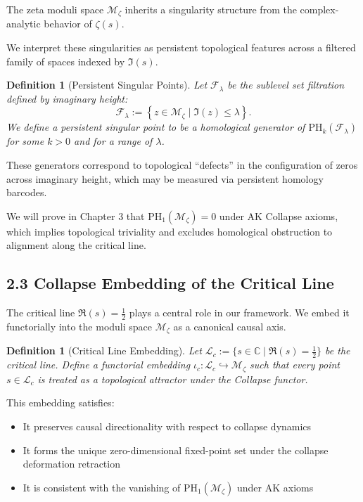 \documentclass[11pt]{article}
\newtheorem{definition}[theorem]{Definition}
\begin{document}
The zeta moduli space $\mathcal{M}_\zeta$ inherits a singularity structure from the complex-analytic behavior of $\zeta(s)$.

We interpret these singularities as persistent topological features across a filtered family of spaces indexed by $\Im(s)$.

\begin{definition}[Persistent Singular Points]
Let $\mathcal{F}_\lambda$ be the sublevel set filtration defined by imaginary height:
\[
\mathcal{F}_\lambda := \left\{ z \in \mathcal{M}_\zeta \mid \Im(z) \leq \lambda \right\}.
\]
We define a \emph{persistent singular point} to be a homological generator of $\mathrm{PH}_k(\mathcal{F}_\lambda)$ for some $k > 0$ and for a range of $\lambda$.
\end{definition}

These generators correspond to topological ``defects'' in the configuration of zeros across imaginary height,  
which may be measured via persistent homology barcodes.

We will prove in Chapter 3 that $\mathrm{PH}_1(\mathcal{M}_\zeta) = 0$ under AK Collapse axioms,  
which implies topological triviality and excludes homological obstruction to alignment along the critical line.

\subsection{2.3 Collapse Embedding of the Critical Line}

The critical line $\Re(s) = \tfrac{1}{2}$ plays a central role in our framework.  
We embed it functorially into the moduli space $\mathcal{M}_\zeta$ as a canonical causal axis.

\begin{definition}[Critical Line Embedding]
Let $\mathcal{L}_c := \{ s \in \mathbb{C} \mid \Re(s) = \tfrac{1}{2} \}$ be the critical line.  
Define a functorial embedding $\iota_c: \mathcal{L}_c \hookrightarrow \mathcal{M}_\zeta$ such that every point $s \in \mathcal{L}_c$  
is treated as a topological attractor under the Collapse functor.
\end{definition}

This embedding satisfies:

\begin{itemize}
    \item It preserves causal directionality with respect to collapse dynamics
    \item It forms the unique zero-dimensional fixed-point set under the collapse deformation retraction
    \item It is consistent with the vanishing of $\mathrm{PH}_1(\mathcal{M}_\zeta)$ under AK axioms
\end{itemize}
\end{document}
